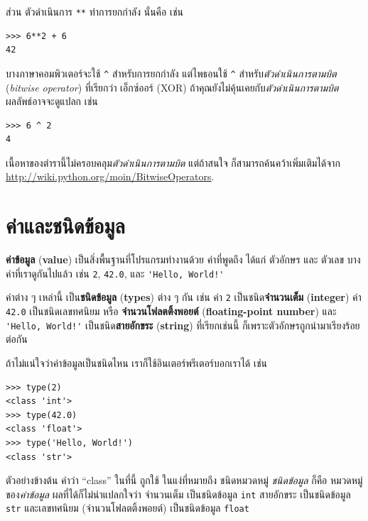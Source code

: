 ส่วน ตัวดำเนินการ \texttt{**} ทำการยกกำลัง 
นั่นคือ เช่น

\begin{verbatim}
>>> 6**2 + 6
42
\end{verbatim}
%
บางภาษาคอมพิวเตอร์จะใช้ \verb"^" สำหรับการยกกำลัง
แต่ไพธอนใช้ \verb"^" สำหรับ\textit{ตัวดำเนินการตามบิต} (\textit{bitwise operator}) ที่เรียกว่า เอ็กซ์ออร์ (XOR)  
ถ้าคุณยังไม่คุ้นเคยกับ\textit{ตัวดำเนินการตามบิต} 
ผลลัพธ์อาจจะดูแปลก เช่น

\begin{verbatim}
>>> 6 ^ 2
4
\end{verbatim}
%
เนื้อหาของตำรานี้ไม่ครอบคลุม\textit{ตัวดำเนินการตามบิต}
แต่ถ้าสนใจ ก็สามารถค้นคว้าเพิ่มเติมได้จาก \url{http://wiki.python.org/moin/BitwiseOperators}.

\section{ค่าและชนิดข้อมูล}

\textbf{ค่าข้อมูล} (\textbf{value}) เป็นสิ่งพื้นฐานที่โปรแกรมทำงานด้วย
ค่าที่พูดถึง ได้แก่ ตัวอักษร และ ตัวเลข
บางค่าที่เราดูกันไปแล้ว เช่น  
\texttt{2},
\texttt{42.0}, และ \verb"'Hello, World!'"

ค่าต่าง ๆ เหล่านี้ เป็น\textbf{ชนิดข้อมูล} (\textbf{types}) ต่าง ๆ กัน
เช่น
ค่า \texttt{2} เป็นชนิด\textbf{จำนวนเต็ม} (\textbf{integer})
ค่า \texttt{42.0} เป็นชนิดเลขทศนิยม หรือ
\textbf{จำนวนโฟลตติ้งพอยต์} (\textbf{floating-point number})
และ \verb"'Hello, World!'" เป็นชนิด\textbf{สายอักขระ} (\textbf{string})
ที่เรียกเช่นนี้ ก็เพราะตัวอักษรถูกนำมาเรียงร้อยต่อกัน

ถ้าไม่แน่ใจว่าค่าข้อมูลเป็นชนิดไหน เราก็ใช้อินเตอร์พรีเตอร์บอกเราได้ เช่น

\begin{verbatim}
>>> type(2)
<class 'int'>
>>> type(42.0)
<class 'float'>
>>> type('Hello, World!')
<class 'str'>
\end{verbatim}
%
ตัวอย่างข้างต้น คำว่า ``class'' ในที่นี้ ถูกใช้ ในแง่ที่หมายถึง ชนิดหมวดหมู่
\textit{ชนิดข้อมูล} ก็คือ หมวดหมู่ของ\textit{ค่าข้อมูล}
%
ผลที่ได้ก็ไม่น่าแปลกใจว่า จำนวนเต็ม เป็นชนิดข้อมูล \texttt{int}
สายอักขระ เป็นชนิดข้อมูล \texttt{str}
และเลขทศนิยม (จำนวนโฟลตติ้งพอยต์) เป็นชนิดข้อมูล \texttt{float}  

